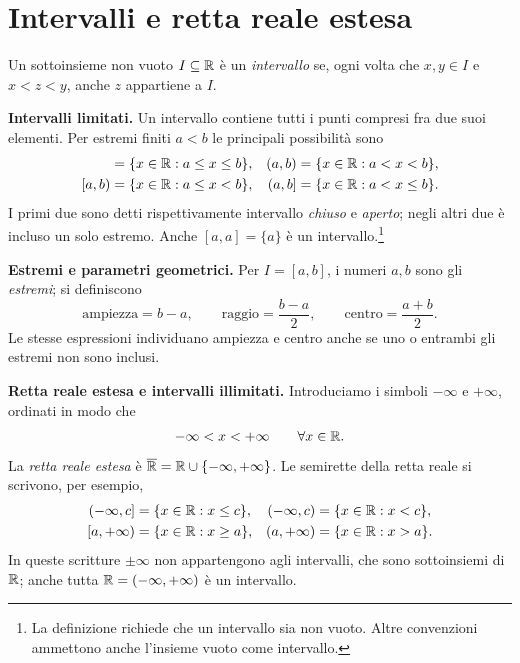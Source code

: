 \section{Intervalli e retta reale estesa}

\begin{definizione}[Intervallo]
Un sottoinsieme non vuoto $I\subseteq\mathbb{R}$ è un \emph{intervallo} se, ogni volta che $x,y\in I$ e $x<z<y$, anche $z$ appartiene a $I$.
\end{definizione}

\textbf{Intervalli limitati.} Un intervallo contiene tutti i punti compresi fra due suoi elementi. Per estremi finiti $a<b$ le principali possibilità sono
\begin{align*}
  [a,b]&=\{x\in\R:a\le x\le b\},&
  (a,b)&=\{x\in\R:a<x<b\},\\
  [a,b)&=\{x\in\R:a\le x<b\},&
  (a,b]&=\{x\in\R:a<x\le b\}.
\end{align*}
I primi due sono detti rispettivamente intervallo \emph{chiuso} e \emph{aperto}; negli altri due è incluso un solo estremo. Anche $[a,a]=\{a\}$ è un intervallo.\footnote{La definizione richiede che un intervallo sia non vuoto. Altre convenzioni ammettono anche l'insieme vuoto come intervallo.}

\textbf{Estremi e parametri geometrici.} Per $I=[a,b]$, i numeri $a,b$ sono gli \emph{estremi}; si definiscono
\[
  \text{ampiezza}=b-a,\qquad
  \text{raggio}=\frac{b-a}{2},\qquad
  \text{centro}=\frac{a+b}{2}.
\]
Le stesse espressioni individuano ampiezza e centro anche se uno o entrambi gli estremi non sono inclusi.

\textbf{Retta reale estesa e intervalli illimitati.} Introduciamo i simboli $-\infty$ e $+\infty$, ordinati in modo che
\[
  -\infty<x<+\infty\qquad\forall x\in\mathbb{R}.
\]
La \emph{retta reale estesa} è $\overline{\mathbb{R}}=\mathbb{R}\cup\{-\infty,+\infty\}$. Le semirette della retta reale si scrivono, per esempio,
\begin{align*}
  (-\infty,c]&=\{x\in\mathbb{R}:x\le c\},&
  (-\infty,c)&=\{x\in\mathbb{R}:x<c\},\\
  [a,+\infty)&=\{x\in\mathbb{R}:x\ge a\},&
  (a,+\infty)&=\{x\in\mathbb{R}:x>a\}.
\end{align*}
In queste scritture $\pm\infty$ non appartengono agli intervalli, che sono sottoinsiemi di $\mathbb{R}$; anche tutta $\mathbb{R}=(-\infty,+\infty)$ è un intervallo.

